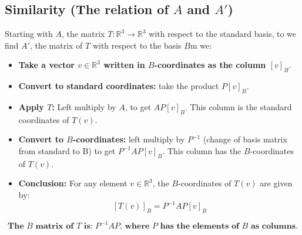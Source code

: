 \documentclass[a4paper, 9pt]{extarticle}
\begin{document}
\subsection{Similarity (The relation of $A$ and $A'$)}
Starting with $A$, the matrix $T: \mathbb{R}^3 \to \mathbb{R}^3$ with respect to the standard basis, to we find $A'$, the matrix of $T$ with respect to the basis $B$m we:
\begin{itemize}
  \item \textbf{Take a vector $v \in \mathbb{R}^3$ written in $B$-coordinates as the column $[v]_B$}.
  \item \textbf{Convert to standard coordinates:} take the product $P[v]_B$.
  \item \textbf{Apply $T$:} Left multiply by $A$, to get $AP[v]_B$. This column is the standard coordinates of $T(v)$.
  \item \textbf{Convert to $B$-coordinates:} left multiply by $P^{-1}$ (change of basis matrix from standard to B) to get $P^{-1}AP[v]_B$. This column has the $B$-coordinates of $T(v)$.
  \item \textbf{Conclusion:}  For any element $v \in \mathbb{R}^3$, the $B$-coordinates of $T(v)$ are given by:
        $$
          [T(v)]_B = P^{-1}AP[v]_B
        $$
\end{itemize}
$$\textbf{The $B$ matrix of $T$ is: $P^{-1}AP$, where $P$ has the elements of $B$ as columns.}$$
\end{document}
